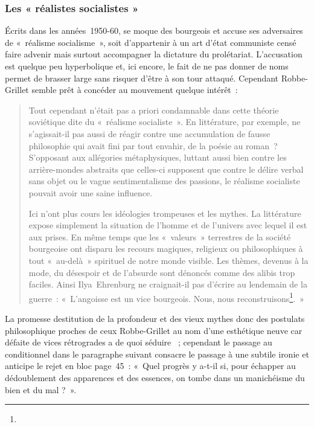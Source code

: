 \documentclass[12pt, a4paper]{article}
\begin{document}
\subsubsection{Les « réalistes socialistes »}
\label{engages}
Écrits dans les années~1950-60, \punr{} se moque des bourgeois et accuse ses adversaires de «~réalisme socialisme~», soit d'appartenir à un art d'état communiste censé faire advenir mais surtout accompagner la dictature du prolétariat. L'accusation est quelque peu hyperbolique et, ici encore, le fait de ne pas donner de noms permet de brasser large sans risquer d'être à son tour attaqué. Cependant Robbe-Grillet semble prêt à concéder au mouvement quelque intérêt~:
\begin{quote}
    Tout cependant n’était pas a priori condamnable dans cette théorie soviétique dite du «~réalisme socialiste~». En littérature, par exemple, ne s’agissait-il pas aussi de réagir contre une accumulation de fausse philosophie qui avait fini par tout envahir, de la poésie au roman~? S’opposant aux allégories métaphysiques, luttant aussi bien contre les arrière-mondes abstraits que celles-ci supposent que contre le délire verbal sans objet ou le vague sentimentalisme des passions, le réalisme socialiste pouvait avoir une saine influence.

    Ici n’ont plus cours les idéologies trompeuses et les mythes. La littérature expose simplement la situation de l’homme et de l’univers avec lequel il est aux prises. En même temps que les «~valeurs~» terrestres de la société bourgeoise ont disparu les recours magiques, religieux ou philosophiques à tout «~au-delà~» spirituel de notre monde visible. Les thèmes, devenus à la mode, du désespoir et de l’absurde sont dénoncés comme des alibis trop faciles. Ainsi Ilya~Ehrenburg ne craignait-il pas d’écrire au lendemain de la guerre~: «~L’angoisse est un vice bourgeois. Nous, nous reconstruisons\footnote{}.~»
\end{quote}
La promesse destitution de la profondeur et des vieux mythes donc des postulats philosophique proches de ceux Robbe-Grillet au nom d'une esthétique neuve car défaite de vices rétrogrades a de quoi séduire \robbe{}~; cependant le passage au conditionnel dans le paragraphe suivant consacre le passage à une subtile ironie et anticipe le rejet en bloc page~45~: «~Quel progrès y a-t-il si, pour échapper au dédoublement des apparences et des essences, on tombe dans un manichéisme du bien et du mal ?~».
\end{document}
